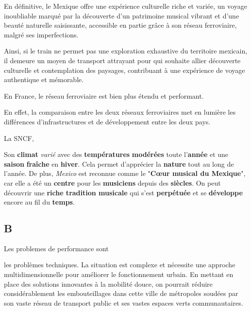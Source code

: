 \documentclass[12pt, a4paper]{article}
\begin{document}
En définitive, le Mexique offre une expérience culturelle riche et variée, un voyage inoubliable marqué par la découverte d'un patrimoine musical vibrant et d'une beauté naturelle saisissante, accessible en partie grâce à son réseau ferroviaire, malgré ses imperfections.

Ainsi, si le train ne permet pas une exploration exhaustive du territoire mexicain, il demeure un moyen de transport attrayant pour qui souhaite allier découverte culturelle et contemplation des paysages, contribuant à une expérience de voyage authentique et mémorable.

En France, le réseau ferroviaire est bien plus étendu et performant.

En effet, la comparaison entre les deux réseaux ferroviaires met en lumière les différences d'infrastructures et de développement entre les deux pays.

La SNCF, 

Son \textbf{climat} \textit{varié} avec des \textbf{températures} \textbf{modérées} toute l’\textbf{année} et une \textbf{saison} \textbf{fraîche} en \textbf{hiver}. Cela permet d’apprécier la \textbf{nature} tout au long de l’année. De plus, \textit{Mexico} est reconnue comme le "\textbf{Cœur musical du Mexique}", car elle a été un \textbf{centre} pour les \textbf{musiciens} depuis des \textbf{siècles}. On peut découvrir une \textbf{riche tradition musicale} qui s’est \textbf{perpétuée} et se \textbf{développe} encore au fil du \textbf{temps}.



\subsection{B}



Les problemes de performance sont 

les problèmes techniques. La situation est complexe et nécessite une approche multidimensionnelle pour améliorer le fonctionnement urbain. En mettant en place des solutions innovantes à la mobilité douce, on pourrait réduire considérablement les embouteillages dans cette ville de métropoles soudées par son vaste réseau de transport public et ses vastes espaces verts communautaires.
\end{document}
